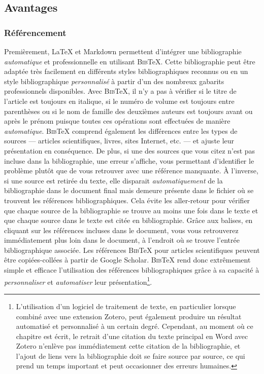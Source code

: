 \documentclass[
  letterpaper,
  DIV=11,
  numbers=noendperiod]{scrreprt}
\begin{document}
\subsection{Avantages}\label{avantages-3}

\subsubsection{Référencement}\label{ruxe9fuxe9rencement}

Premièrement, LaTeX et Markdown permettent d'intégrer une bibliographie
\emph{automatique} et professionnelle en utilisant \textsc{Bib}TeX.
Cette bibliographie peut être adaptée très facilement en différents
styles bibliographiques reconnus ou en un style bibliographique
\emph{personnalisé} à partir d'un des nombreux gabarits professionnels
disponibles. Avec \textsc{Bib}TeX, il n'y a pas à vérifier si le titre
de l'article est toujours en italique, si le numéro de volume est
toujours entre parenthèses ou si le nom de famille des deuxièmes auteurs
est toujours avant ou après le prénom puisque toutes ces opérations sont
effectuées de manière \emph{automatique}. \textsc{Bib}TeX comprend
également les différences entre les types de sources --- articles
scientifiques, livres, sites Internet, etc. --- et ajuste leur
présentation en conséquence. De plus, si une des sources que vous citez
n'est pas incluse dans la bibliographie, une erreur s'affiche, vous
permettant d'identifier le problème plutôt que de vous retrouver avec
une référence manquante. À l'inverse, si une source est retirée du
texte, elle disparait \emph{automatiquement} de la bibliographie dans le
document final mais demeure présente dans le fichier où se trouvent les
références bibliographiques. Cela évite les aller-retour pour vérifier
que chaque source de la bibliographie se trouve au moins une fois dans
le texte et que chaque source dans le texte est citée en bibliographie.
Grâce aux balises, en cliquant sur les références incluses dans le
document, vous vous retrouverez immédiatement plus loin dans le
document, à l'endroit où se trouve l'entrée bibliographique associée.
Les références \textsc{Bib}TeX pour articles scientifiques peuvent être
copiées-collées à partir de Google Scholar. \textsc{Bib}TeX rend donc
extrêmement simple et efficace l'utilisation des références
bibliographiques grâce à sa capacité à \emph{personnaliser} et
\emph{automatiser} leur présentation\footnote{L'utilisation d'un
  logiciel de traitement de texte, en particulier lorsque combiné avec
  une extension Zotero, peut également produire un résultat automatisé
  et personnalisé à un certain degré. Cependant, au moment où ce
  chapitre est écrit, le retrait d'une citation du texte principal en
  Word avec Zotero n'enlève pas immédiatement cette citation de la
  bibliographie, et l'ajout de liens vers la bibliographie doit se faire
  source par source, ce qui prend un temps important et peut occasionner
  des erreurs humaines.}.
\end{document}
